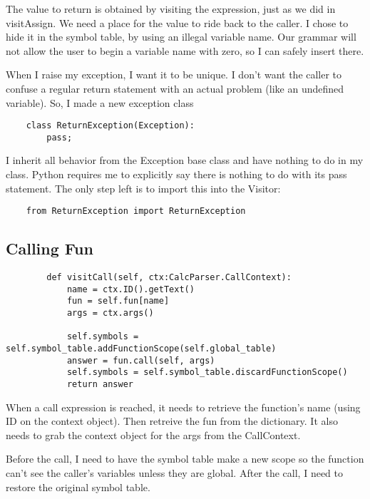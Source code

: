 The value to return is obtained by visiting the expression, just as
we did in visitAssign. We need a place for the value to ride back to the
caller. I chose to hide it in the symbol table, by using an illegal
variable name. Our grammar will not allow the user to begin a variable
name with zero, so I can safely insert there.

When I raise my exception, I want it to be unique. I don't want the
caller to confuse a regular return statement with an actual problem
(like an undefined variable). So, I made a new exception class

{\footnotesize
\begin{verbatim}
    class ReturnException(Exception):
        pass;
\end{verbatim}
}

I inherit all behavior from the Exception base class and have nothing
to do in my class. Python requires me to explicitly say there is nothing
to do with its pass statement. The only step left is to import this
into the Visitor:

{\footnotesize
\begin{verbatim}
    from ReturnException import ReturnException
\end{verbatim}
}

\subsection{Calling Fun}

{\footnotesize
\begin{verbatim}
        def visitCall(self, ctx:CalcParser.CallContext):
            name = ctx.ID().getText()
            fun = self.fun[name]
            args = ctx.args()

            self.symbols = self.symbol_table.addFunctionScope(self.global_table)
            answer = fun.call(self, args)
            self.symbols = self.symbol_table.discardFunctionScope()
            return answer
\end{verbatim}
}

When a call expression is reached, it needs to retrieve the function's
name (using ID on the context object). Then retreive the fun from the
dictionary. It also needs to grab the context object for the args
from the CallContext.

Before the call, I need to have the symbol table make a new scope so
the function can't see the caller's variables unless they are global.
After the call, I need to restore the original symbol table.

